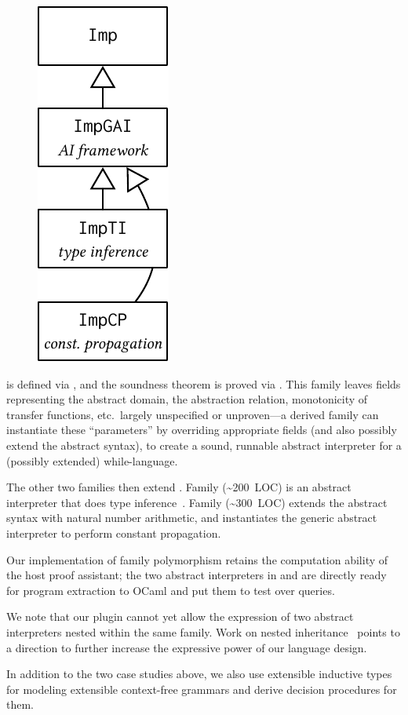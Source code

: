 \begin{figure}
\includegraphics[scale=.68]{graphics/ai-casestudy.pdf}
\end{figure}

\noindent
{} is defined via , and the soundness theorem
is proved via .
This family leaves fields representing the abstract domain, the
abstraction relation, monotonicity of transfer functions, etc.\ 
largely unspecified or unproven---a derived family can instantiate these
``parameters'' by overriding appropriate fields (and also possibly extend the abstract syntax),
to create a sound, runnable abstract interpreter for a (possibly extended) while-language.

The other two families then extend .
Family  (\textasciitilde200~LOC) is an abstract
interpreter that does type inference~\cite{cousot1997types}.
Family  (\textasciitilde300~LOC) extends the abstract syntax
with natural number arithmetic,
and instantiates the generic abstract interpreter to perform constant propagation.

Our implementation of family polymorphism retains the computation
ability of the host proof assistant;
the two abstract interpreters in  and  are
directly ready for program extraction to OCaml and put them to test over queries.

We note that our plugin cannot yet allow the expression of two abstract
interpreters nested within the same family.
Work on nested inheritance~\cite{ncm2004,zm2017} points to a direction
to further increase the expressive power of our language design.

In addition to the two case studies above, we also use extensible
inductive types for modeling extensible context-free grammars and derive
decision procedures for them.

